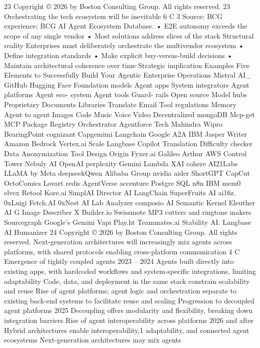 23
Copyright © 2026 by Boston Consulting Group. All rights reserved.
23
Orchestrating the tech ecosystem will be inevitable
6
C
3
Source: BCG experience; BCG AI Agent Ecosystem Database.
•
E2E autonomy exceeds the
scope of any single vendor
•
Most solutions address slices of
the stack
Structural reality
Enterprises must deliberately
orchestrate the multivendor
ecosystem
•
Define integration standards
•
Make explicit buy-versus-build
decisions
•
Maintain architectural
coherence over time
Strategic implication
Examples
Five Elements to Successfully Build Your Agentic Enterprise Operations
Mistral AI\_
GitHub
Hugging Face
Foundation
models
Agent
apps
System
integrators
Agent
platforms
Agent
eco-
system
Agent
tools
Guard-
rails
Open source
Model hubs
Proprietary
Documents
Libraries
Translate
Email
Tool regulations
Memory
Agent to agent
Images
Code
Music
Voice
Video
Decentralized
mongoDB
Mcp-get
MCP Package Registry
Orchestrator
Agentforce
Tech Mahindra
Wipro
BearingPoint
cognizant
Capgemimi
Langchain
Google A2A
IBM
Jasper
Writer
Amazon
Bedrock
Vertex.ai
Scale
Langbase
Copilot
Translation
Difficulty
checker
Data
Anonymization
Tool
Design Origin
Fyxer.ai
Galileo
Arthur
AWS Control Tower
Nebuly AI
OpenAI
perplexity
Gemini
Lambda
XAI
cohere
AI21Labs
LLaMA by Meta
deepseekQwen
Alibaba Group
nvidia
aider
ShortGPT
CapCut
OctoComics
Lovart
redis
AgentVerse
accenture
Postgre SQL
n8n
IBM
mem0
elvex
Retool
Kore.ai
SimplAI
Director
AI
LangChain
SuperFruits AI
ai16z.
0xLuigi
Fetch.AI
0xNest AI
Lab
Analyzer
composio
AI
Semantic Kernel
Eleuther AI
G
Image
Describer X
Builder.io
Swissmote
MP3 cutters and
ringtone makers
Sourcegraph
Google's Gemini
Vapi
Play.ht
Teammates.ai
Stability AI.
Langbase
AI
Humanizer
24
Copyright © 2026 by Boston Consulting Group. All rights reserved.
Next-generation architectures will increasingly mix agents across
platforms, with shared protocols enabling cross-platform communication
4
C
Emergence of tightly
coupled agents
2023 – 2024
Agents built directly into existing apps, with
hardcoded workflows and system-specific
integrations, limiting adaptability
Code, data, and deployment in the same stack
constrain scalability and reuse
Rise of agent platforms; agent logic and
orchestration separate to existing back-end
systems to facilitate reuse and scaling
Progression to decoupled
agent platforms
2025
Decoupling offers modularity and flexibility,
breaking down integration barriers
Rise of agent interoperability
across platforms
2026 and after
Hybrid architectures enable interoperability,1
adaptability, and connected agent ecosystems
Next-generation architectures may mix agents
